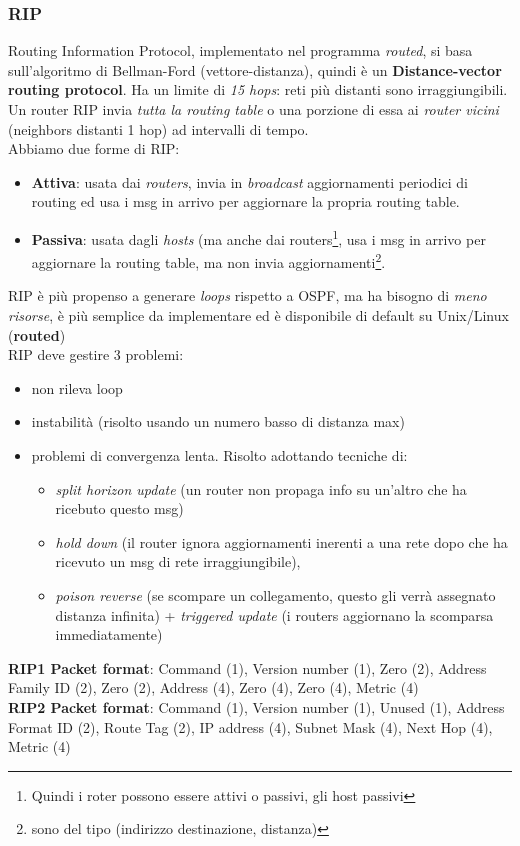 \documentclass[a4paper,11pt]{article}
\begin{document}
\subsubsection{RIP}
Routing Information Protocol, implementato nel programma \textit{routed}, si basa sull'algoritmo di Bellman-Ford (vettore-distanza), quindi è un \textbf{Distance-vector routing protocol}.
Ha un limite di \textit{15 hops}: reti più distanti sono irraggiungibili.\\
Un router RIP invia \textit{tutta la routing table} o una porzione di essa ai \textit{router vicini} (neighbors distanti 1 hop) ad intervalli di tempo.\\
Abbiamo due forme di RIP:
\begin{itemize}
\item\textbf{Attiva}: usata dai \textit{routers}, invia in \textit{broadcast} aggiornamenti periodici di routing ed usa i msg in arrivo per aggiornare la propria routing table.
\item\textbf{Passiva}: usata dagli \textit{hosts} (ma anche dai routers\footnote{Quindi i roter possono essere attivi o passivi, gli host passivi}, usa i msg in arrivo per aggiornare la routing table, ma non invia aggiornamenti\footnote{sono del tipo (indirizzo destinazione, distanza)}.
\end{itemize}                                                                                                               RIP è più propenso a generare \textit{loops} rispetto a OSPF, ma ha bisogno di \textit{meno risorse}, è più semplice da implementare ed è disponibile di default su Unix/Linux (\textbf{routed})\\
RIP deve gestire 3 problemi:
\begin{itemize}
\item non rileva loop
\item instabilità (risolto usando un numero basso di distanza max)
\item problemi di convergenza lenta. Risolto adottando tecniche di: \begin{itemize}
\item\textit{split horizon update} (un router non propaga info su un'altro che ha ricebuto questo msg)
\item\textit{hold down} (il router ignora aggiornamenti inerenti a una rete dopo che ha ricevuto un msg di rete irraggiungibile), \item\textit{poison reverse} (se scompare un collegamento, questo gli verrà assegnato distanza infinita) + \textit{triggered update} (i routers aggiornano la scomparsa immediatamente)
\end{itemize}
\end{itemize}
\textbf{RIP1 Packet format}: Command (1), Version number (1), Zero (2), Address Family ID (2), Zero (2), Address (4), Zero (4), Zero (4), Metric (4)\\
\textbf{RIP2 Packet format}: Command (1), Version number (1), Unused (1), Address Format ID (2), Route Tag (2), IP address (4), Subnet Mask (4), Next Hop (4), Metric (4)
\end{document}
